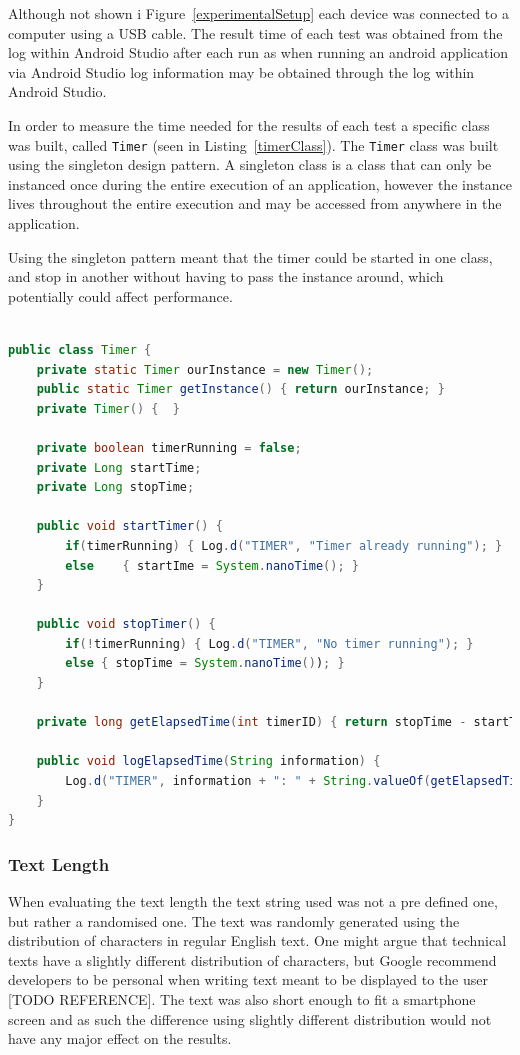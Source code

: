 Although not shown i Figure~\ref{experimentalSetup} each device was connected to a computer using a USB cable. The  result time of each test was obtained from the log within Android Studio after each run as when running an android application via Android Studio log information may be obtained through the log within Android Studio.

In order to measure the time needed for the results of each test a specific class was built, called \texttt{Timer} (seen in Listing~\ref{timerClass}). The \texttt{Timer} class was built using the singleton design pattern. A singleton class is a class that can only be instanced once during the entire execution of an application, however the instance lives throughout the entire execution and may be accessed from anywhere in the application.

Using the singleton pattern meant that the timer could be started in one class, and stop in another without having to pass the instance around, which potentially could affect performance.

\begin{lstlisting}[language=Java, caption={The Timer class}, label=timerClass]

public class Timer {
	private static Timer ourInstance = new Timer();
	public static Timer getInstance() { return ourInstance; }
	private Timer() {  }
	
	private boolean timerRunning = false;
	private Long startTime;
	private Long stopTime;
	
	public void startTimer() { 
		if(timerRunning) { Log.d("TIMER", "Timer already running"); }
		else 	{ startIme = System.nanoTime(); }
	}
	
	public void stopTimer() {
		if(!timerRunning) { Log.d("TIMER", "No timer running"); }
		else { stopTime = System.nanoTime()); }
	}
	
	private long getElapsedTime(int timerID) { return stopTime - startTime; }
	
	public void logElapsedTime(String information) {
		Log.d("TIMER", information + ": " + String.valueOf(getElapsedTime() + " nano seconds");
	}
}
\end{lstlisting}

\subsubsection{Text Length}
When evaluating the text length the text string used was not a pre defined one, but rather a randomised one. The text was randomly generated using the distribution of characters in regular English text. One might argue that technical texts have a slightly different distribution of characters, but Google recommend developers to be personal when writing text meant to be displayed to the user [TODO REFERENCE]. The text was also short enough to fit a smartphone screen and as such the difference using slightly different distribution would not have any major effect on the results.

